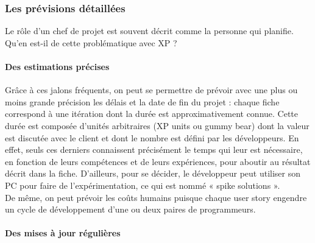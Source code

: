\documentclass[]{article}
\let\oldparagraph\paragraph
\renewcommand{\paragraph}[1]{\oldparagraph{#1}\mbox{}}
\begin{document}
\hypertarget{les-pruxe9visions-duxe9tailluxe9es}{%
\subsubsection{Les prévisions
détaillées}\label{les-pruxe9visions-duxe9tailluxe9es}}

Le rôle d'un chef de projet est souvent décrit comme la personne qui
planifie. Qu'en est-il de cette problématique avec XP ?




\hypertarget{des-estimations-pruxe9cises}{%
\paragraph{Des estimations précises}\label{des-estimations-pruxe9cises}}

Grâce à ces jalons fréquents, on peut se permettre de prévoir avec une
plus ou moins grande précision les délais et la date de fin du projet :
chaque fiche correspond à une itération dont la durée est
approximativement connue. Cette durée est composée d'unités arbitraires
(XP units ou gummy bear) dont la valeur est discutée avec le client et
dont le nombre est défini par les développeurs. En effet, seuls ces
derniers connaissent précisément le temps qui leur est nécessaire, en
fonction de leurs compétences et de leurs expériences, pour aboutir au
résultat décrit dans la fiche. D'ailleurs, pour se décider, le
développeur peut utiliser son PC pour faire de l'expérimentation, ce qui
est nommé « spike solutions ».\\
De même, on peut prévoir les coûts humains puisque chaque user story
engendre un cycle de développement d'une ou deux paires de programmeurs.



\hypertarget{des-mises-uxe0-jour-ruxe9guliuxe8res}{%
\paragraph{Des mises à jour
régulières}\label{des-mises-uxe0-jour-ruxe9guliuxe8res}}
\end{document}
